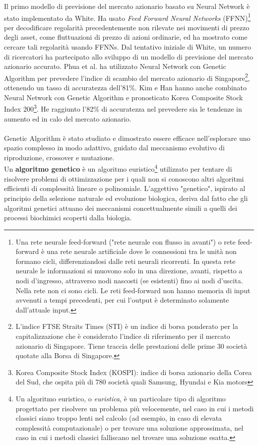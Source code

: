 \documentclass[a4paper,12pt]{report}
\begin{document}
Il primo modello di previsione del mercato azionario basato su Neural Network è stato implementato da White\cite{whitenn}. Ha usato \textit{Feed Forward Neural Networks} (FFNN)\footnote{Una rete neurale feed-forward ("rete neurale con flusso in avanti") o rete feed-forward è una rete neurale artificiale dove le connessioni tra le unità non formano cicli, differenziandosi dalle reti neurali ricorrenti. In questa rete neurale le informazioni si muovono solo in una direzione, avanti, rispetto a nodi d'ingresso, attraverso nodi nascosti (se esistenti) fino ai nodi d'uscita. Nella rete non ci sono cicli. Le reti feed-forward non hanno memoria di input avvenuti a tempi precedenti, per cui l'output è determinato solamente dall'attuale input. } per decodificare regolarità precedentemente non rilevate nei movimenti di prezzo degli asset, come fluttuazioni di prezzo di azioni ordinarie, ed ha mostrato come cercare tali regolarità usando FFNNs. Dal tentativo iniziale di White, un numero di ricercatori ha partecipato allo sviluppo di un modello di previsione del mercato azionario accurato. Phua et al. \cite{puann} ha utilizzato Neural Network con Genetic Algorithm per prevedere l'indice di scambio del mercato azionario di Singapore\footnote{L'indice FTSE Straits Times (STI) è un indice di borsa ponderato per la capitalizzazione che è considerato l'indice di riferimento per il mercato azionario di Singapore. Tiene traccia delle prestazioni delle prime 30 società quotate alla Borsa di Singapore.}, ottenendo un tasso di accuratezza dell'81\%. Kim e Han \cite{kimnn} hanno anche combinato Neural Network con Genetic Algorithm e pronosticato Korea Composite Stock Index 200\footnote{Korea Composite Stock Index (KOSPI): indice di borsa azionario della Corea del Sud, che ospita più di 780 società quali Samsung, Hyundai e Kia motors}. He raggiunto l'82\% di accuratezza nel prevedere sia le tendenze in aumento ed in calo del mercato azionario.\\~\\
Genetic Algorithm è stato studiato e dimostrato essere efficace nell'esplorare uno spazio complesso in modo adattivo, guidato dal meccanismo evolutivo di riproduzione, crossover e mutazione.\\
Un \textbf{algoritmo genetico} è un algoritmo euristico\footnote{Un algoritmo euristico, o \textit{euristica}, è un particolare tipo di algoritmo progettato per risolvere un problema più velocemente, nel caso in cui i metodi classici siano troppo lenti nel calcolo (ad esempio, in caso di elevata complessità computazionale) o per trovare una soluzione approssimata, nel caso in cui i metodi classici falliscano nel trovare una soluzione esatta.} utilizzato per tentare di risolvere problemi di ottimizzazione per i quali non si conoscono altri algoritmi efficienti di complessità lineare o polinomiale. L'aggettivo "genetico", ispirato al principio della selezione naturale ed evoluzione biologica, deriva dal fatto che gli algoritmi genetici attuano dei meccanismi concettualmente simili a quelli dei processi biochimici scoperti dalla biologia.\\
\end{document}
